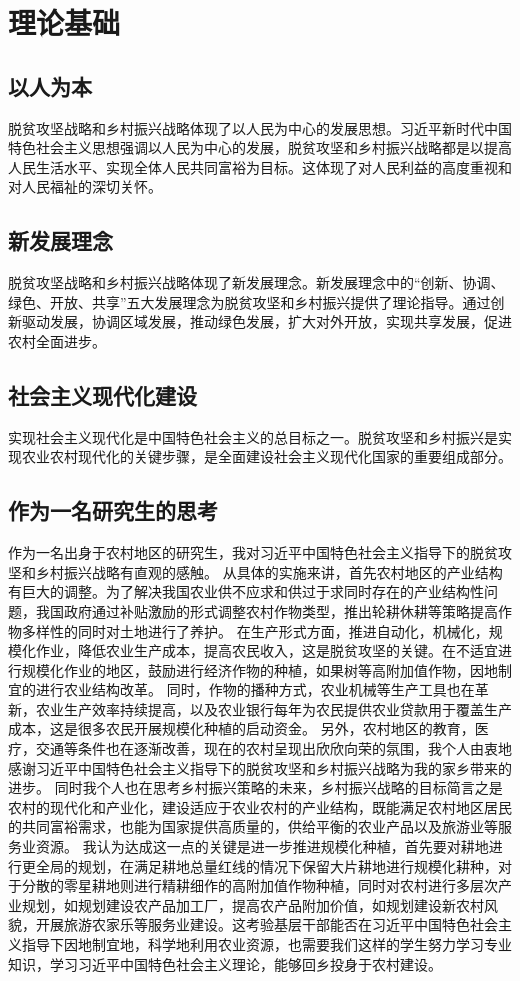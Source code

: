 \documentclass{article}
\begin{document}
\section{理论基础}
\subsection{以人为本}
脱贫攻坚战略和乡村振兴战略体现了以人民为中心的发展思想。习近平新时代中国特色社会主义思想强调以人民为中心的发展，脱贫攻坚和乡村振兴战略都是以提高人民生活水平、实现全体人民共同富裕为目标。这体现了对人民利益的高度重视和对人民福祉的深切关怀。
\subsection{新发展理念}
脱贫攻坚战略和乡村振兴战略体现了新发展理念。新发展理念中的“创新、协调、绿色、开放、共享”五大发展理念为脱贫攻坚和乡村振兴提供了理论指导。通过创新驱动发展，协调区域发展，推动绿色发展，扩大对外开放，实现共享发展，促进农村全面进步。
\subsection{社会主义现代化建设}
实现社会主义现代化是中国特色社会主义的总目标之一。脱贫攻坚和乡村振兴是实现农业农村现代化的关键步骤，是全面建设社会主义现代化国家的重要组成部分。
\subsection{作为一名研究生的思考}
作为一名出身于农村地区的研究生，我对习近平中国特色社会主义指导下的脱贫攻坚和乡村振兴战略有直观的感触。
从具体的实施来讲，首先农村地区的产业结构有巨大的调整。为了解决我国农业供不应求和供过于求同时存在的产业结构性问题，我国政府通过补贴激励的形式调整农村作物类型，推出轮耕休耕等策略提高作物多样性的同时对土地进行了养护。
在生产形式方面，推进自动化，机械化，规模化作业，降低农业生产成本，提高农民收入，这是脱贫攻坚的关键。在不适宜进行规模化作业的地区，鼓励进行经济作物的种植，如果树等高附加值作物，因地制宜的进行农业结构改革。
同时，作物的播种方式，农业机械等生产工具也在革新，农业生产效率持续提高，以及农业银行每年为农民提供农业贷款用于覆盖生产成本，这是很多农民开展规模化种植的启动资金。
另外，农村地区的教育，医疗，交通等条件也在逐渐改善，现在的农村呈现出欣欣向荣的氛围，我个人由衷地感谢习近平中国特色社会主义指导下的脱贫攻坚和乡村振兴战略为我的家乡带来的进步。
同时我个人也在思考乡村振兴策略的未来，乡村振兴战略的目标简言之是农村的现代化和产业化，建设适应于农业农村的产业结构，既能满足农村地区居民的共同富裕需求，也能为国家提供高质量的，供给平衡的农业产品以及旅游业等服务业资源。
我认为达成这一点的关键是进一步推进规模化种植，首先要对耕地进行更全局的规划，在满足耕地总量红线的情况下保留大片耕地进行规模化耕种，对于分散的零星耕地则进行精耕细作的高附加值作物种植，同时对农村进行多层次产业规划，如规划建设农产品加工厂，提高农产品附加价值，如规划建设新农村风貌，开展旅游农家乐等服务业建设。这考验基层干部能否在习近平中国特色社会主义指导下因地制宜地，科学地利用农业资源，也需要我们这样的学生努力学习专业知识，学习习近平中国特色社会主义理论，能够回乡投身于农村建设。
{}

\end{document}

